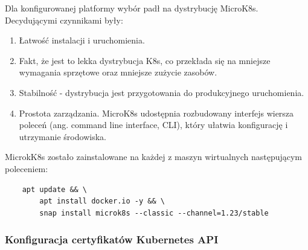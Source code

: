 \begin{samepage}
    Dla konfigurowanej platformy wybór padł na dystrybucję MicroK8s\cite{microk8s-docs-home}.
    Decydującymi czynnikami były:
    \begin{enumerate}
        \item Łatwość instalacji i uruchomienia.
        \item Fakt, że jest to lekka dystrybucja K8s, co przekłada się na mniejsze wymagania sprzętowe oraz mniejsze zużycie zasobów.
        \item Stabilność - dystrybucja jest przygotowania do produkcyjnego uruchomienia.
        \item Prostota zarządzania. MicroK8s udostępnia rozbudowany interfejs wiersza poleceń (ang. command line interface, CLI), który ułatwia konfigurację i utrzymanie środowiska.
    \end{enumerate}
\end{samepage}

MicrokK8s zostało zainstalowane na każdej z maszyn wirtualnych następującym poleceniem:
\begin{verbatim}
    apt update && \
        apt install docker.io -y && \
        snap install microk8s --classic --channel=1.23/stable
\end{verbatim}

\subsubsection{Konfiguracja certyfikatów Kubernetes API}

